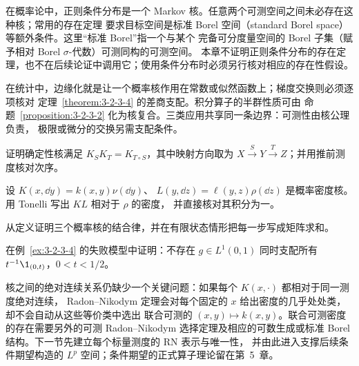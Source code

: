 \begin{remark}[正则条件分布与核]
在概率论中，正则条件分布是一个 Markov 核。任意两个可测空间之间未必存在这种核；常用的存在定理
要求目标空间是标准 Borel 空间（standard Borel space）等额外条件。这里“标准 Borel”指一个与某个
完备可分度量空间的 Borel 子集（赋予相对 Borel $\sigma$-代数）可测同构的可测空间。
本章不证明正则条件分布的存在定理，也不在后续论证中调用它；使用条件分布时必须另行核对相应的存在性假设。
\end{remark}

在统计中，边缘化就是让一个概率核作用在常数或似然函数上；梯度交换则必须逐项核对
定理~\ref{theorem:3-2-3-4} 的差商支配。积分算子的半群性质可由
命题~\ref{proposition:3-2-3-2} 化为核复合。三类应用共享同一条边界：可测性由核公理负责，
极限或微分的交换另需支配条件。

\begin{exercise}
证明确定性核满足 $K_SK_T=K_{T\circ S}$，其中映射方向取为
$X\xrightarrow{S}Y\xrightarrow{T}Z$；并用推前测度核对次序。
\end{exercise}
\begin{exercise}
设 $K(x,\dd y)=k(x,y)\nu(\dd y)$、
$L(y,\dd z)=\ell(y,z)\rho(\dd z)$ 是概率密度核。用 Tonelli 写出 $KL$ 相对于 $\rho$ 的密度，
并直接核对其积分为一。
\end{exercise}
\begin{exercise}
从定义证明三个概率核的结合律，并在有限状态情形把每一步写成矩阵求和。
\end{exercise}
\begin{exercise}
在例~\ref{ex:3-2-3-4} 的失败模型中证明：不存在 $g\in L^1(0,1)$ 同时支配所有
$t^{-1}\1_{(0,t)}$，$0<t<1/2$。
\end{exercise}

核之间的绝对连续关系仍缺少一个关键问题：如果每个 $K(x,\cdot)$ 都相对于同一测度绝对连续，
Radon--Nikodym 定理会对每个固定的 $x$ 给出密度的几乎处处类，却不会自动从这些等价类中选出
联合可测的 $(x,y)\mapsto k(x,y)$。联合可测密度的存在需要另外的可测 Radon--Nikodym
选择定理及相应的可数生成或标准 Borel 结构。下一节先建立每个标量测度的 RN 表示与唯一性，
并由此进入支撑后续条件期望构造的 $L^p$ 空间；条件期望的正式算子理论留在第~5~章。
